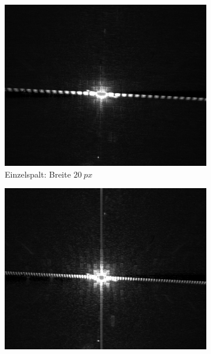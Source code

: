 \documentclass[
	a4paper,
	12pt,
	pagesize,
	ngerman
]{scrartcl}
\begin{document}
\begin{figure}[H]
        \centering
        \begin{subfigure}[b]{0.475\textwidth}
            \centering
            \includegraphics[width=\textwidth]{raw/singleslid_20_width}
            \caption%
            {Einzelspalt: Breite $\SI{20}{px}$}
            \label{fig_singleslid_20}
        \end{subfigure}
        \hfill
        \begin{subfigure}[b]{0.475\textwidth}
            \centering
            \includegraphics[width=\textwidth]{raw/singleslid_50_width}

\end{subfigure}
\end{figure}
\end{document}

